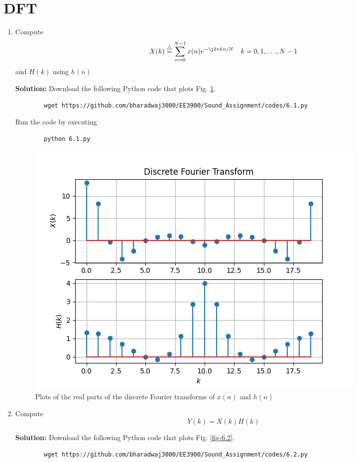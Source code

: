 \documentclass[journal,12pt,twocolumn]{IEEEtran}
\newcommand{\solution}{\noindent \textbf{Solution: }}
\numberwithin{equation}{section}
\renewcommand\thesection{\arabic{section}}
\newcommand{\define}{\stackrel{\triangle}{=}}
\begin{document}
	\section{DFT}
	\begin{enumerate}[label=\thesection.\arabic*]
	\item Compute
	\begin{equation}
		X(k) \define \sum _{n=0}^{N-1}x(n) e^{-\j2\pi kn/N} \quad k = 0,1,\dots, N-1
	\end{equation}
	and $H(k)$ using $h(n)$
	
	\solution Download the following Python code that plots Fig. \ref{fig-6.1}.
	\begin{lstlisting}
		wget https://github.com/bharadwaj3000/EE3900/Sound_Assignment/codes/6.1.py
	\end{lstlisting}
	
	Run the code by executing
	\begin{lstlisting}
		python 6.1.py
	\end{lstlisting}

	\begin{figure}[!ht]
		\centering
		\includegraphics[width=\columnwidth]{./figs/6.1.png}
		\caption{Plots of the real parts of the discrete Fourier transforms of $x(n)$ and $h(n)$}
		\label{fig-6.1}	
	\end{figure}
	
	\item Compute 
	\begin{equation}
		Y(k) = X(k)H(k)
	\end{equation}
	
	\solution Download the following Python code that plots Fig. \ref{fig-6.2}.
	\begin{lstlisting}
		wget https://github.com/bharadwaj3000/EE3900/Sound_Assignment/codes/6.2.py
	\end{lstlisting}
	

\end{enumerate}
\end{document}
